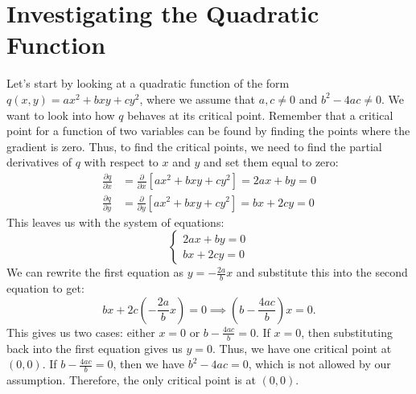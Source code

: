 \documentclass{article}
\newcommand{\mpfrac}[1]{\frac{\partial}{\partial #1}}
\begin{document}
\section{Investigating the Quadratic Function}

Let's start by looking at a quadratic function of the form \( q(x, y) = ax^2 + bxy + cy^2 \), where we assume that \( a, c \neq 0 \) and \( b^{2} - 4ac \ne 0 \). We want to look into how \( q \) behaves at its critical point. Remember that a critical point for a function of two variables can be found by finding the points where the gradient is zero. Thus, to find the critical points, we need to find the partial derivatives of \( q \) with respect to \( x \) and \( y \) and set them equal to zero:
\begin{align*}
	\frac{\partial q}{\partial x} &= \mpfrac{x} [ax^2 + bxy + cy^2] = 2ax + by = 0 \\
	\frac{\partial q}{\partial y} &= \frac{\partial}{\partial y} [ax^2 + bxy + cy^2] = bx + 2cy = 0
\end{align*}
This leaves us with the system of equations:
\[
	\begin{cases}
		2ax + by = 0 \\
		bx + 2cy = 0
	\end{cases}
\]
We can rewrite the first equation as \( y = -\frac{2a}{b}x \) and substitute this into the second equation to get:
\[
	bx + 2c\left(-\frac{2a}{b}x\right) = 0 \implies \left(b - \frac{4ac}{b}\right)x = 0.
\]
This gives us two cases: either \( x = 0 \) or \( b - \frac{4ac}{b} = 0 \). If \( x = 0 \), then substituting back into the first equation gives us \( y = 0 \). Thus, we have one critical point at \( (0, 0) \). If \( b - \frac{4ac}{b} = 0 \), then we have \( b^2 - 4ac = 0 \), which is not allowed by our assumption. Therefore, the only critical point is at \( (0, 0) \). \\
\end{document}
